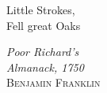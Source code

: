 \renewcommand{\epigraphsize}{\large}
\renewcommand{\textflush}{flushright}
\renewcommand{\sourceflush}{flushleft}
\setlength{\epigraphwidth}{0.3\textwidth}

\begin{titlingpage}
  \begin{vplace}
    \epigraph{
      Little Strokes,\\
      Fell great Oaks
    }{
      \textit{Poor Richard's\\Almanack, 1750}\\
      \textsc{Benjamin Franklin}
    }
  \end{vplace}
\end{titlingpage}